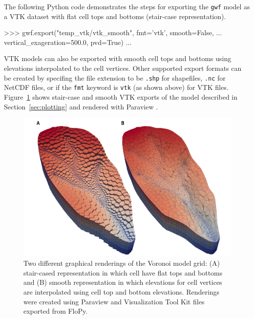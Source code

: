 \documentclass[11pt, oneside]{article}  	%
\begin{document}
The following Python code demonstrates the steps for exporting the  \texttt{gwf} model as a VTK dataset with flat cell tops and bottoms (stair-case representation).

\begin{python}
>>> gwf.export("temp_vtk/vtk_smooth", fmt='vtk', smooth=False,
... vertical_exageration=500.0, pvd=True)
...
\end{python}

\noindent VTK models can also be exported with smooth cell tops and bottoms using elevations interpolated to the cell vertices. Other supported export formats can be created by specifing the file extension to be \texttt{.shp} for shapefiles, \texttt{.nc} for NetCDF files, or if the \texttt{fmt} keyword is \texttt{vtk} (as shown above) for VTK files.  Figure~\ref{fig:flopyvtk} shows stair-case and smooth VTK exports of the model described in Section~\ref{sec:plotting} and rendered with Paraview \citep{ahrens2005paraview}.

\begin{figure}[ht!]
	\begin{center}
		\includegraphics{figures/mf6vtk.pdf}
	\end{center}
	\caption{Two different graphical renderings of the Voronoi model grid: (A) stair-cased representation in which cell have flat tops and bottoms and (B) smooth representation in which elevations for cell vertices are interpolated using cell top and bottom elevations.  Renderings were created using Paraview \citep{ahrens2005paraview} and Visualization Tool Kit \citep{schroeder:2006:VTK} files exported from FloPy.}
	\label{fig:flopyvtk}
\end{figure}
\end{document}
